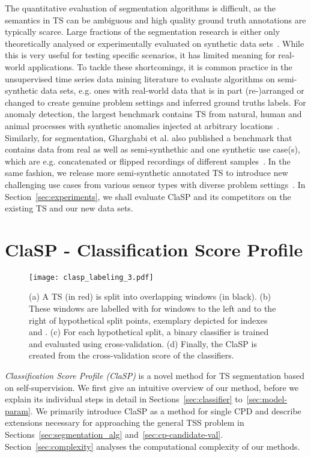 \documentclass[pdflatex,sn-basic]{sn-jnl}
\begin{document}
The quantitative evaluation of segmentation algorithms is difficult, as the semantics in TS can be ambiguous and high quality ground truth annotations are typically scarce. Large fractions of the segmentation research is either only theoretically analysed or experimentally evaluated on synthetic data sets~\citep{truong2020selective}. While this is very useful for testing specific scenarios, it has limited meaning for real-world applications. To tackle these shortcomings, it is common practice in the unsupervised time series data mining literature to evaluate algorithms on semi-synthetic data sets, e.g. ones with real-world data that is in part (re-)arranged or changed to create genuine problem settings and inferred ground truths labels. For anomaly detection, the largest benchmark contains  TS from natural, human and animal processes with synthetic anomalies injected at arbitrary locations~\citep{KeoghMultiDatasetTADC}. Similarly, for segmentation, Gharghabi et al. also published a benchmark that contains data from  real as well as  semi-synthethic and one synthetic use case(s), which are e.g. concatenated or flipped recordings of different samples~\citep{gharghabi2017matrix}. In the same fashion, we release more semi-synthetic annotated TS to introduce new challenging use cases from various sensor types with diverse problem settings~\citep{TSSBWebpage}. In Section~\ref{sec:experiments}, we shall evaluate ClaSP and its competitors on the existing TS and our new data sets.


\section{ClaSP - Classification Score Profile}\label{sec:clasp_method}

\begin{figure}[t]
    \centering
	\texttt{[image: clasp\_labeling\_3.pdf]}
	\caption{(a) A TS (in red) is split into overlapping windows (in black). (b) These windows are labelled with  for windows to the left and  to the right of hypothetical split points, exemplary depicted for indexes  and . (c) For each hypothetical split, a binary classifier is trained and evaluated using cross-validation. (d) Finally, the ClaSP is created from the cross-validation score of the classifiers.
	\label{fig:clasp_labeling}
	}
\end{figure}

\emph{Classification Score Profile (ClaSP)} is a novel method for TS segmentation based on self-supervision. We first give an intuitive overview of our method, before we explain its individual steps in detail in Sections~\ref{sec:classifier} to~\ref{sec:model-param}. We primarily introduce ClaSP as a method for single CPD and describe extensions necessary for approaching the general TSS problem in Sections~\ref{sec:segmentation_alg} and~\ref{sec:cp-candidate-val}. Section~\ref{sec:complexity} analyses the computational complexity of our methods.
\end{document}
